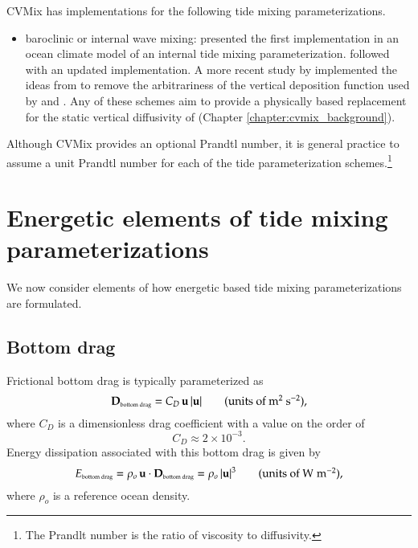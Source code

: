 CVMix has implementations for the following tide mixing
parameterizations.
\begin{itemize}
 
\item {\sc baroclinic or internal wave mixing}: \cite{Simmonsetal2004}
  presented the first implementation in an ocean climate model of an
  internal tide mixing parameterization.  \cite{Jayne2009} followed
  with an updated implementation.  A more recent study by
  \cite{Melet_etal_2013} implemented the ideas from \cite{Polzin2009}
  to remove the arbitrariness of the vertical deposition function used
  by \cite{Simmonsetal2004} and \cite{Jayne2009}.  Any of these
  schemes aim to provide a physically based replacement for the static
  vertical diffusivity of \cite{BryanLewis1979} (Chapter
  \ref{chapter:cvmix_background}).

\end{itemize}
Although CVMix provides an optional Prandtl number, it is general
practice to assume a unit Prandtl number for each of the tide
parameterization schemes.\footnote{The Prandlt number is the ratio of
  viscosity to diffusivity.}



\section{Energetic elements of tide mixing parameterizations}
\label{section:vert_tidal_formulation}

We now consider elements of how energetic based tide mixing
parameterizations are formulated.


\subsection{Bottom drag}
\label{subsection:bottom-drag-barotropic-tides}

Frictional bottom drag is typically parameterized as
\begin{equation}
  {\bf D}_{\mbox{\tiny bottom drag}} = C_{D} \, {\bf u} \, | {\bf u}|
  \qquad \mbox{(units of $\mbox{m}^{2}~\mbox{s}^{-2}$),}
\end{equation}
where $C_{D}$ is a dimensionless drag coefficient with a value on the
order of
\begin{equation}
C_{D} \approx  2 \times 10^{-3}. 
\end{equation}
Energy dissipation associated with this bottom drag is given by
\begin{equation}
 E_{\mbox{\tiny bottom drag}} =
  \rho_{o} \, {\bf u} \cdot {\bf D}_{\mbox{\tiny bottom drag}} 
 = \rho_{o} \, |{\bf u}|^{3}
\qquad \mbox{(units of $\mbox{W} \; \mbox{m}^{-2}$),}
\label{eq:energy-dissipation-bottom-drag-general}
\end{equation}
where $\rho_{o}$ is a reference ocean density.  

